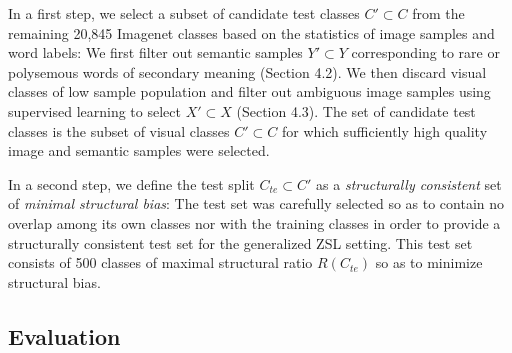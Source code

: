 In a first step, we select a subset of candidate test classes $C' \subset C$ from the remaining 20,845 Imagenet classes based on the statistics of image samples and word labels:
We first filter out semantic samples $Y' \subset Y$ corresponding to rare or polysemous words of secondary meaning (Section 4.2).
We then discard visual classes of low sample population and filter out ambiguous image samples using supervised learning to select $X' \subset X$ (Section 4.3).
The set of candidate test classes is the subset of visual classes $C' \subset C$ for which sufficiently high quality image and semantic samples were selected.

In a second step, we define the test split $C_{te} \subset C'$ as a \textit{structurally consistent} set of \textit{minimal structural bias}:
The test set was carefully selected so as to contain no overlap among its own classes nor with the training classes in order to provide a structurally consistent test set for the generalized ZSL setting.
This test set consists of 500 classes of maximal structural ratio $R(C_{te})$ so as to minimize structural bias.


\subsection{Evaluation}

